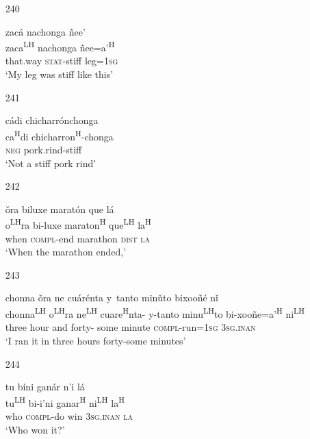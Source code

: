 \begin{itemize}
\item[240]
 
\glll  zac\'{a} nachonga \~{n}ee'\\
zaca\textsuperscript{LH} nachonga \~{n}ee=a'\textsuperscript{H}\\
that.way \textsc{stat}-stiff leg=\textsc{1sg}\\
\glt `My leg was stiff like this'
 


\item[241]
 
\glll   c\'{a}di chicharr\'{o}nchonga\\
 ca\textsuperscript{H}di chicharron\textsuperscript{H}-chonga\\
\textsc{neg} pork.rind-stiff\\
\glt `Not a stiff pork rind'
 


\item[242]
 
\glll   \v{o}ra biluxe marat\'{o}n que l\'{a}\\
 o\textsuperscript{LH}ra bi-luxe maraton\textsuperscript{H} que\textsuperscript{LH} la\textsuperscript{H}\\
 when \textsc{compl}-end marathon \textsc{dist} \textsc{la}\\
\glt `When the marathon ended,'
 


\item[243]
 
\glll chonna                     \v{o}ra                 ne                     cu\'{a}r\'{e}nta y~tanto min\v{u}to bixoo\~{n}\'{e} n\v{i}\\
      chonna\textsuperscript{LH} o\textsuperscript{LH}ra ne\textsuperscript{LH} cuare\textsuperscript{H}nta- y-tanto minu\textsuperscript{LH}to bi-xoo\~{n}e=a'\textsuperscript{H} ni\textsuperscript{LH}\\ 
three hour and forty- some minute \textsc{compl}-run=\textsc{1sg} \textsc{3sg.inan}\\
\glt `I ran it in three hours forty-some minutes'
 


\item[244]
 
\glll   tu b\'{i}ni gan\'{a}r n'{i} l\'{a}\\
tu\textsuperscript{LH} bi-i'ni ganar\textsuperscript{H} ni\textsuperscript{LH} la\textsuperscript{H}\\
who \textsc{compl}-do win \textsc{3sg.inan} \textsc{la}\\
\glt `Who won it?'
 


\end{itemize}
